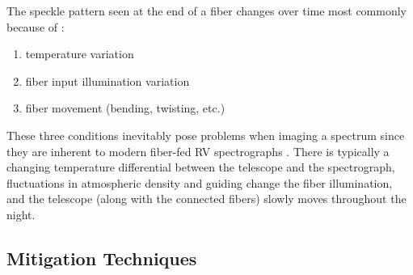 \documentclass[twocolumn]{emulateapj}
\begin{document}
The speckle pattern seen at the end of a fiber changes over time most commonly because of \citep{Epworth1978}:
\begin{enumerate}
\item temperature variation
\item fiber input illumination variation
\item fiber movement (bending, twisting, etc.)
\end{enumerate}
These three conditions inevitably pose problems when imaging a spectrum since they are inherent to modern fiber-fed RV spectrographs \citep{Baudrand2001, Mahadevan2014}. There is typically a changing temperature differential between the telescope and the spectrograph, fluctuations in atmospheric density and guiding change the fiber illumination, and the telescope (along with the connected fibers) slowly moves throughout the night.

\subsection{Mitigation Techniques}
\label{subsec:mitigation}
\end{document}
